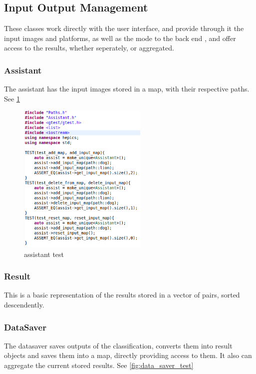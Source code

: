 \documentclass[parskip=full]{scrartcl}
\begin{document}
\pagebreak
\subsection{Input Output Management}
These classes work directly with the user interface, and provide through it the input images and platforms, as well as the mode to the back end , and offer access to the results, whether seperately, or aggregated.
\subsubsection{Assistant}
The assistant has the input images stored in a map, with their respective paths. See \ref{fig:assistant_test} %

\begin{figure}[h]
		\centering
		\includegraphics[width=0.55\textwidth]{assistant_test}
		\caption{assistant test}
		\label{fig:assistant_test}
\end{figure}


\subsubsection{Result}
This is a basic representation of the results stored in a vector of pairs, sorted descendently.
\subsubsection{DataSaver}
The datasaver saves outputs of the classification, converts them into result objects and saves them into a map, directly providing access to them. It also can aggregate the current stored results. See \ref{fig:data_saver_test} %
\end{document}
